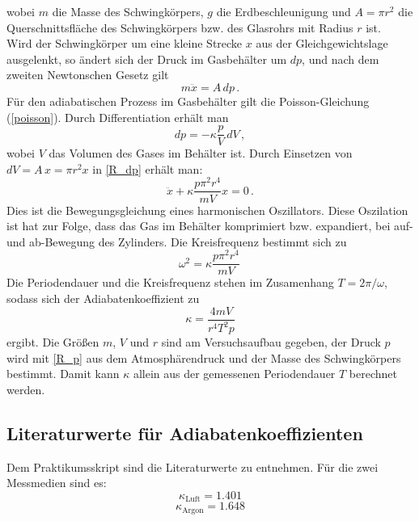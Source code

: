 wobei \(m\) die Masse des Schwingkörpers, \(g\) die Erdbeschleunigung und \(A = \pi r^2\) die Querschnittsfläche des Schwingkörpers bzw. des Glasrohrs mit Radius \(r\) ist.\\
Wird der Schwingkörper um eine kleine Strecke \(x\) aus der Gleichgewichtslage ausgelenkt, so ändert sich der Druck im Gasbehälter um \(dp\), und nach dem zweiten Newtonschen Gesetz gilt
\begin{equation}\label{R_newton}
    m \ddot x = A \, dp \, .
\end{equation}
Für den adiabatischen Prozess im Gasbehälter gilt die Poisson-Gleichung (\ref{poisson}). Durch Differentiation erhält man
\begin{equation}\label{R_dp}
    dp = - \kappa \frac{p}{V} \, dV \, ,
\end{equation}
wobei \(V\) das Volumen des Gases im Behälter ist. Durch Einsetzen von \(dV = A \, x = \pi r^2 x\) in \cref{R_dp} erhält man:
\begin{equation}\label{R_oscillator}
    \ddot x + \kappa \frac{p \pi^2 r^4}{m V} x = 0 \, .
\end{equation}
Dies ist die Bewegungsgleichung eines harmonischen Oszillators. Diese Oszilation ist hat zur Folge, dass das Gas im Behälter komprimiert bzw. expandiert, bei auf- und ab-Bewegung des Zylinders. Die Kreisfrequenz bestimmt sich zu
\begin{equation}\label{R_omega}
    \omega^2 = \kappa \frac{p \pi^2 r^4}{m V} \, 
\end{equation}
Die Periodendauer und die Kreisfrequenz stehen im Zusamenhang \(T = 2\pi / \omega\), sodass sich der Adiabatenkoeffizient zu
\begin{equation}\label{R_k_final}
    \kappa = \frac{4 m V}{r^4 T^2 p}
\end{equation}
ergibt. Die Größen \(m\), \(V\) und \(r\) sind am Versuchsaufbau gegeben, der Druck \(p\) wird mit \cref{R_p} aus dem Atmosphärendruck und der Masse des Schwingkörpers bestimmt. Damit kann \(\kappa\) allein aus der gemessenen Periodendauer \(T\) berechnet werden.

\subsection{Literaturwerte für Adiabatenkoeffizienten}
Dem Praktikumsskript\autocite{Skript_2.1} sind die Literaturwerte zu entnehmen. Für die zwei Messmedien sind es:
\begin{equation}\label{lit_luft}
    \kappa_\text{Luft} = 1.401
\end{equation}
\begin{equation}\label{lit_ar}
    \kappa_\text{Argon} = 1.648
\end{equation}
